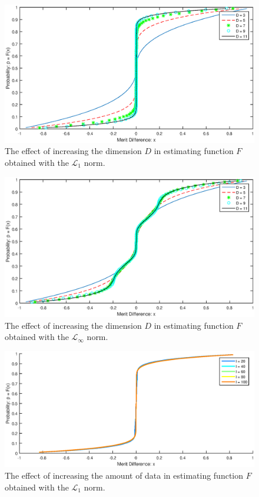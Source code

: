 \documentclass[twoside,11pt]{article}
\begin{document}
\begin{figure}
  \centering
    \includegraphics[width=1\textwidth]{L1_figure_7}
    \caption{The effect of increasing the dimension $D$ in estimating function $F$ obtained with the $\mathcal{L}_{1}$ norm. \label{L1_figure_7}}
\end{figure}

\begin{figure}
  \centering
    \includegraphics[width=1\textwidth]{Linf_figure_7}
    \caption{The effect of increasing the dimension $D$ in estimating function $F$ obtained with the $\mathcal{L}_{\infty}$ norm. \label{Linf_figure_7}}
\end{figure}

\begin{figure}
  \centering
    \includegraphics[width=1\textwidth]{L1_figure_8}
    \caption{The effect of increasing the amount of data in estimating function $F$ obtained with the $\mathcal{L}_{1}$ norm. \label{L1_figure_8}}
\end{figure}
\end{document}
